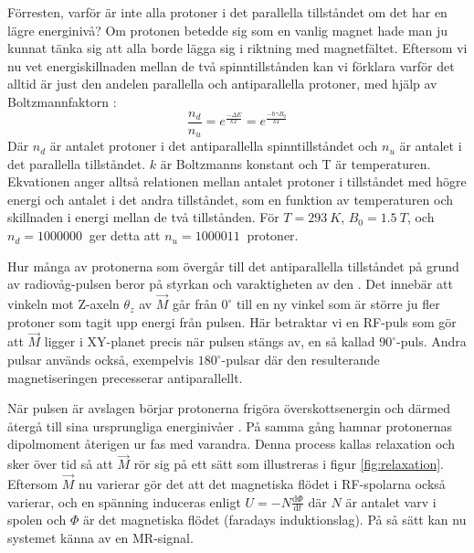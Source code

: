 \documentclass[11pt, a4paper]{article}
\begin{document}
Förresten, varför är inte alla protoner i det parallella tillståndet om det har en lägre energinivå? Om protonen betedde sig som en vanlig magnet hade man ju kunnat tänka sig att alla borde lägga sig i riktning med magnetfältet. Eftersom vi nu vet energiskillnaden mellan de två spinntillstånden kan vi förklara varför det alltid är just den andelen parallella och antiparallella protoner, med hjälp av Boltzmannfaktorn \parencite[s. 90]{mri_lärobok}:
\begin{equation}
	\frac{n_d}{n_u}=e^\frac{-\Delta E}{kT}=e^\frac{-\hbar\gamma B_0}{kT}
\end{equation}
Där $n_d$ är antalet protoner i det antiparallella spinntillståndet och $n_u$ är antalet i det parallella tillståndet. $k$ är Boltzmanns konstant och T är temperaturen. Ekvationen anger alltså relationen mellan antalet protoner i tillståndet med högre energi och antalet i det andra tillståndet, som en funktion av temperaturen och skillnaden i energi mellan de två tillstånden. För $T=\SI{293}{K}$, $B_0=\SI{1.5}{T}$, och $n_d=\SI{1000000}{}$ ger detta att $n_u=\SI{1000011}{}$ protoner.

Hur många av protonerna som övergår till det antiparallella tillståndet på grund av radiovåg-pulsen beror på styrkan och varaktigheten av den \parencite{mri_for_radiologists}. Det innebär att vinkeln mot Z-axeln $\theta_z$ av $\vec{M}$ går från $0^\circ$ till en ny vinkel som är större ju fler protoner som tagit upp energi från pulsen. Här betraktar vi en RF-puls som gör att $\vec{M}$ ligger i XY-planet precis när pulsen stängs av, en så kallad $90^\circ$-puls. Andra pulsar används också, exempelvis $180^\circ$-pulsar där den resulterande magnetiseringen precesserar antiparallellt.

När pulsen är avslagen börjar protonerna frigöra överskottsenergin och därmed återgå till sina ursprungliga energinivåer \parencite{understanding_mri}. På samma gång hamnar protonernas dipolmoment återigen ur fas med varandra. Denna process kallas relaxation och sker över tid så att $\vec{M}$ rör sig på ett sätt som illustreras i figur \ref{fig:relaxation}. Eftersom $\vec{M}$ nu varierar gör det att det magnetiska flödet i RF-spolarna också varierar, och en spänning induceras enligt $U=-N\frac{\mathrm{d}\Phi}{\mathrm{d}t}$ där $N$ är antalet varv i spolen och $\Phi$ är det magnetiska flödet (faradays induktionslag). På så sätt kan nu systemet känna av en MR-signal.
\end{document}
